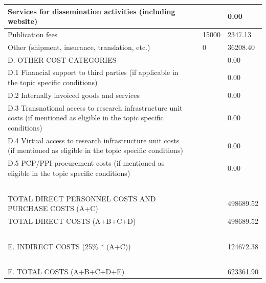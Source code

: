 \begin{table}[H]
\begin{tabular}{|l|l|l|l|}
Services for dissemination activities (including website) & ~ & ~ & 0.00 \\ \hline
Publication fees & ~ & 15000 & 2347.13 \\ \hline
Other (shipment, insurance, translation, etc.) & ~ & 0 & 36208.40 \\ \hline
D. OTHER COST CATEGORIES & ~ & ~ & 0.00\\ \hline
D.1 Financial support to third parties (if applicable in the topic specific conditions) & ~ & ~ & 0.00 \\ \hline
D.2 Internally invoiced goods and services & ~ & ~ & 0.00 \\ \hline
D.3 Transnational access to research infrastructure unit costs (if mentioned as eligible in the topic specific conditions) & ~ & ~ & 0.00 \\ \hline
D.4 Virtual access to research infrastructure unit costs (if mentioned as eligible in the topic specific conditions) & ~ & ~ & 0.00 \\ \hline
D.5 PCP/PPI procurement costs (if mentioned as eligible in the topic specific conditions) & ~ & ~ & 0.00 \\ \hline
~ & ~ & ~ & ~ \\ \hline
TOTAL DIRECT PERSONNEL COSTS AND PURCHASE COSTS (A+C) & ~ & ~ & 498689.52 \\ \hline
TOTAL DIRECT COSTS (A+B+C+D) & ~ & ~ & 498689.52 \\ \hline
~ & ~ & ~ & ~ \\ \hline
E. INDIRECT COSTS (25\% * (A+C)) & ~ & ~ & 124672.38 \\ \hline
~ & ~ & ~ & ~ \\ \hline
F. TOTAL COSTS (A+B+C+D+E) & ~ & ~ & 623361.90 \\ \hline
\end{tabular}
\end{table}


